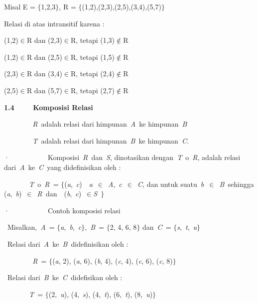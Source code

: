 \documentclass[11pt,fleqn]{book} %
\begin{document}
\begin{myEnumerate}
\begin{itemize}
\noindent 

\noindent Misal E = $\{$1,2,3$\}$, R = $\{$(1,2),(2,3),(2,5),(3,4),(5,7)$\}$

\noindent Relasi di atas intransitif karena :

\noindent (1,2)$\mathrm{\in }$R dan (2,3)$\mathrm{\in }$R, tetapi (1,3)$\mathrm{\notin }$R

\noindent (1,2)$\mathrm{\in }$R dan (2,5)$\mathrm{\in }$R, tetapi (1,5)$\mathrm{\notin }$R

\noindent (2,3)$\mathrm{\in }$R dan (3,4)$\mathrm{\in }$R, tetapi (2,4)$\mathrm{\notin }$R

\noindent (2,5)$\mathrm{\in }$R dan (5,7)$\mathrm{\in }$R, tetapi (2,7)$\mathrm{\notin }$R

\noindent \textbf{1.4 ~~~~Komposisi Relasi}

\noindent 

\noindent \textit{~~~~~~~~R~}adalah relasi dari himpunan~\textit{A~}ke himpunan~\textit{B}

\noindent \textit{~~~~~~~~T~}adalah relasi dari himpunan~\textit{B~}ke himpunan~\textit{C}.

\noindent ·~~~~~~~~~~~Komposisi~\textit{R~}dan~\textit{S}, dinotasikan dengan~\textit{T~}$\mathrm{o}$~\textit{R}, adalah relasi dari~\textit{A~}ke~\textit{C~}yang didefinisikan oleh :

\noindent \textit{~~~~~~~T~}$\mathrm{o}$~\textit{R~}= $\{$(\textit{a},~\textit{c})~{\textbar}~\textit{a~}$\mathrm{\in }$~\textit{A},~\textit{c~}$\mathrm{\in }$~\textit{C}, dan untuk suatu~\textit{b~}$\mathrm{\in }$~\textit{B~}sehingga (\textit{a},~\textit{b})~$\mathrm{\in }$~\textit{R~}dan~~(\textit{b},~\textit{c})~$\mathrm{\in }$\textit{S~}$\}$

\noindent ·~~~~~~~~~~~Contoh komposisi relasi

\noindent {\O}~Misalkan,~\textit{A~}= $\{$\textit{a},~\textit{b},~\textit{c}$\}$,~\textit{B~}= $\{$2, 4, 6, 8$\}$ dan~\textit{C~}= $\{$\textit{s},~\textit{t},~\textit{u}$\}$

\noindent {\O}~Relasi dari~\textit{A~}ke~\textit{B~}didefinisikan oleh :

\noindent \textit{~~~~~~~~R~}= $\{$(\textit{a}, 2), (\textit{a}, 6), (\textit{b}, 4), (\textit{c}, 4), (\textit{c}, 6), (\textit{c}, 8)$\}$

\noindent {\O}~Relasi dari~\textit{B~}ke~\textit{C~}didefisikan oleh :

\noindent \textit{~~~~~~~T~}= $\{$(2,~\textit{u}), (4,~\textit{s}), (4,~\textit{t}), (6,~\textit{t}), (8,~\textit{u})$\}$


\end{itemize}
\end{myEnumerate}
\end{document}
